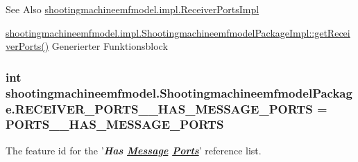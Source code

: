 \begin{DoxySeeAlso}{See Also}
\hyperlink{classshootingmachineemfmodel_1_1impl_1_1_receiver_ports_impl}{shootingmachineemfmodel.\-impl.\-Receiver\-Ports\-Impl} 

\hyperlink{classshootingmachineemfmodel_1_1impl_1_1_shootingmachineemfmodel_package_impl_a821826b4a77ddfe1d4366780aeef3b9c}{shootingmachineemfmodel.\-impl.\-Shootingmachineemfmodel\-Package\-Impl\-::get\-Receiver\-Ports()} Generierter Funktionsblock 
\end{DoxySeeAlso}
\hypertarget{interfaceshootingmachineemfmodel_1_1_shootingmachineemfmodel_package_a7c53dc7a94983b99dae80e1d58d045c9}{
\subsubsection[{R\-E\-C\-E\-I\-V\-E\-R\-\_\-\-P\-O\-R\-T\-S\-\_\-\-\_\-\-H\-A\-S\-\_\-\-M\-E\-S\-S\-A\-G\-E\-\_\-\-P\-O\-R\-T\-S}]{\setlength{\rightskip}{0pt plus 5cm}int shootingmachineemfmodel.\-Shootingmachineemfmodel\-Package.\-R\-E\-C\-E\-I\-V\-E\-R\-\_\-\-P\-O\-R\-T\-S\-\_\-\-\_\-\-H\-A\-S\-\_\-\-M\-E\-S\-S\-A\-G\-E\-\_\-\-P\-O\-R\-T\-S = {\bf P\-O\-R\-T\-S\-\_\-\-\_\-\-H\-A\-S\-\_\-\-M\-E\-S\-S\-A\-G\-E\-\_\-\-P\-O\-R\-T\-S}}}\label{interfaceshootingmachineemfmodel_1_1_shootingmachineemfmodel_package_a7c53dc7a94983b99dae80e1d58d045c9}
The feature id for the '{\itshape {\bfseries Has \hyperlink{interfaceshootingmachineemfmodel_1_1_message}{Message} \hyperlink{interfaceshootingmachineemfmodel_1_1_ports}{Ports}}}' reference list.

